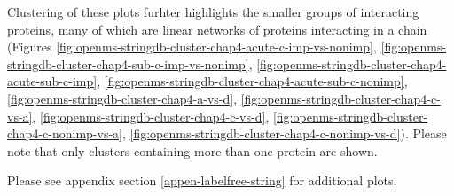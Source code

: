 \documentclass[
]{article}
\begin{document}
Clustering of these plots furhter highlights the smaller groups of interacting proteins, many of which are linear networks of proteins interacting in a chain (Figures \ref{fig:openms-stringdb-cluster-chap4-acute-c-imp-vs-nonimp}, \ref{fig:openms-stringdb-cluster-chap4-sub-c-imp-vs-nonimp}, \ref{fig:openms-stringdb-cluster-chap4-acute-sub-c-imp}, \ref{fig:openms-stringdb-cluster-chap4-acute-sub-c-nonimp}, \ref{fig:openms-stringdb-cluster-chap4-a-vs-d}, \ref{fig:openms-stringdb-cluster-chap4-c-vs-a}, \ref{fig:openms-stringdb-cluster-chap4-c-vs-d}, \ref{fig:openms-stringdb-cluster-chap4-c-nonimp-vs-a}, \ref{fig:openms-stringdb-cluster-chap4-c-nonimp-vs-d}).
Please note that only clusters containing more than one protein are shown.

Please see appendix section \ref{appen-labelfree-string} for additional plots.
\end{document}
